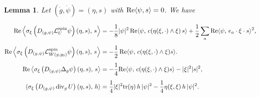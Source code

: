 \documentclass{amsart}
\newtheorem{lemma}[theorem]{Lemma}
\theoremstyle{definition}
\theoremstyle{remark}
\numberwithin{equation}{section}
\newcommand{\tr}{\textup{tr}}
\renewcommand{\div}{\,\textup{div}}
\begin{document}
\bigskip




\begin{lemma}\label{lem;symbol_3}
	Let $(\dot{g}, \dot{\psi}) = (\eta, s)$ with $\textup{Re}\langle \psi,s\rangle =0$. We have
	
	\begin{equation}
	\begin{aligned}
	\textup{Re}\left\langle \sigma_{\xi}\left(  D_{(g,\psi)} \mathcal{L}_{U}^{\text{spin}}\psi \right)(\eta,s),\,s \right\rangle & = -\frac{1}{8} |\psi|^2\,  \textup{Re}\langle \psi,\, c(\eta(\xi,\cdot)\wedge \xi)\, s\rangle + \frac{1}{2}  \sum_a\textup{Re} \langle\psi,\, e_a\cdot \xi\cdot s\rangle^2,\\[1ex]
	\textup{Re}\left\langle\sigma_{\xi}\left( D_{(g,\psi)} \mathcal{L}_{W(g,g_0)}^{\text{spin}}\psi \right)(\eta,s),\, s \right\rangle  &= -\frac{1}{2}\,\textup{Re}\langle  \psi,\,c(\eta(\xi,\cdot)\wedge\xi) s\rangle.\\[1ex]
	\textup{Re}\left\langle \sigma_{\xi}\left( D_{(g,\psi)}\Delta_g\psi \right)(\eta,s),\, s \right\rangle &= -\frac{1}{4}\textup{Re}\langle \psi,\, c( \eta(\xi,\cdot)\wedge\xi) s\rangle - |\xi|^2 |s|^2,\\[1ex]
	\langle \sigma_{\xi}\left( D_{(g,\psi)}\div_g\, U \right)(\eta,s),\, h\rangle  &=   \frac{1}{4}|\xi|^2\tr(\eta)\, h\,|\psi|^2 -  \frac{1}{4}\eta(\xi,\xi)\,h\,|\psi|^2.
		\end{aligned}
	\end{equation}

\end{lemma}
\end{document}
